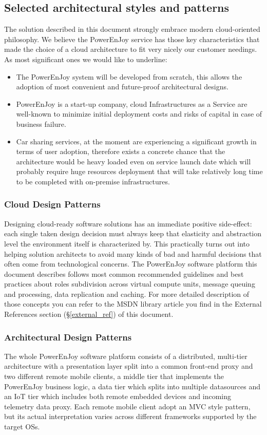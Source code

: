\subsection{Selected architectural styles and patterns}
The solution described in this document strongly embrace modern cloud-oriented philosophy. We believe the PowerEnJoy service has those key characteristics that made the choice of a cloud architecture to fit very nicely our customer needings.
As most significant ones we would like to underline:
\begin{itemize}
    \item The PowerEnJoy system will be developed from scratch, this allows the adoption of most convenient and future-proof architectural designs.
    \item PowerEnJoy is a start-up company, cloud Infrastructures as a Service are well-known to minimize initial deployment costs and risks of capital in case of business failure.
    \item Car sharing services, at the moment are experiencing a significant growth in terms of user adoption, therefore exists a concrete chance that the architecture would be heavy loaded even on service launch date which will probably require huge resources deployment that will take relatively long time to be completed with on-premise infrastructures.
\end{itemize}
\subsubsection{Cloud Design Patterns}
Designing cloud-ready software solutions has an immediate positive side-effect: each single taken design decision must always keep that elasticity and abstraction level the environment itself is characterized by. This practically turns out into helping solution architects to avoid many kinds of bad and harmful decisions that often come from technological concerns. The PowerEnJoy software platform this document describes follows most common recommended guidelines and best practices about roles subdivision across virtual compute units, message queuing and processing, data replication and caching. For more detailed description of those concepts you can refer to the MSDN library article you find in the External References section (§\ref{external_ref}) of this document.

\subsubsection{Architectural Design Patterns}
The whole PowerEnJoy software platform consists of a distributed, multi-tier architecture with a presentation layer split into a common front-end proxy and two different remote mobile clients, a middle tier that implements the PowerEnJoy business logic, a data tier which splits into multiple datasources and an IoT tier which includes both remote embedded devices and incoming telemetry data proxy. Each remote mobile client adopt an MVC style pattern, but its actual interpretation varies across different frameworks supported by the target OSs.


